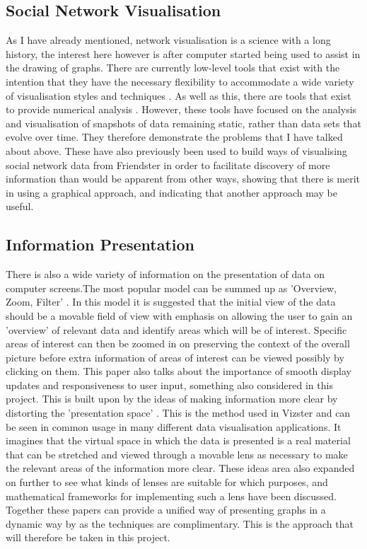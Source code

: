 \documentclass[12pt,a4paper]{article}
\begin{document}
\subsection{Social Network Visualisation}
As I have already mentioned, network visualisation is a science with a long history, the interest here however is after computer started being used to assist in the drawing of graphs. There are currently low-level tools that exist with the intention that they have the necessary flexibility to accommodate a wide variety of visualisation styles and techniques \cite{heer2005prefuse}. As well as this, there are tools that exist to provide numerical analysis \cite{borgatti2002ucinet}. However, these tools have focused on the analysis and visualisation of snapshots of data remaining static, rather than data sets that evolve over time. They therefore demonstrate the problems that I have talked about above. These have also previously been used to build ways of visualising social network data from Friendster \cite{heer2005vizster} in order to facilitate discovery of more information than would be apparent from other ways, showing that there is merit in using a graphical approach, and indicating that another approach may be useful.

\subsection{Information Presentation}
There is also a wide variety of information on the presentation of data on computer screens.The most popular model can be summed up as 'Overview, Zoom, Filter' \cite{shneiderman1996eyes}. In this model it is suggested that the initial view of the data should be a movable field of view with emphasis on allowing the user to gain an 'overview' of relevant data and identify areas which will be of interest. Specific areas of interest can then be zoomed in on preserving the context of the overall picture before extra information of areas of interest can be viewed possibly by clicking on them. This paper also talks about the importance of smooth display updates and responsiveness to user input, something also considered in this project. This is built upon by the ideas of making information more clear by distorting the 'presentation space' \cite{carpendale2001framework}. This is the method used in Vizster and can be seen in common usage in many different data visualisation applications. It imagines that the virtual space in which the data is presented is a real material that can be stretched and viewed through a movable lens as necessary to make the relevant areas of the information more clear. These ideas area also expanded on further to see what kinds of lenses are suitable for which purposes, and mathematical frameworks for implementing such a lens \cite{leung1994review} have been discussed. Together these papers can provide a unified way of presenting graphs in a dynamic way by as the techniques are complimentary. This is the approach that will therefore be taken in this project.
\end{document}
